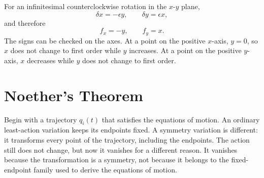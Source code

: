 For an infinitesimal counterclockwise rotation in the \(x\)-\(y\) plane,
\begin{equation}
 \delta x=-\epsilon y,
 \qquad
 \delta y=\epsilon x,
 \label{eq:l04-infinitesimal-rotation}
\end{equation}
and therefore
\begin{equation}
 f_x=-y,
 \qquad f_y=x.
\end{equation}
The signs can be checked on the axes. At a point on the positive \(x\)-axis,
\(y=0\), so \(x\) does not change to first order while \(y\) increases. At a
point on the positive \(y\)-axis, \(x\) decreases while \(y\) does not change
to first order.

\begin{classroomqa}
\end{classroomqa}

\begin{classroomqa}
\end{classroomqa}

\section{Noether's Theorem}

Begin with a trajectory \(q_i(t)\) that satisfies the equations of motion.
An ordinary least-action variation keeps its endpoints fixed. A symmetry
variation is different: it transforms every point of the trajectory, including
the endpoints. The action still does not change, but now it vanishes for a
different reason. It vanishes because the transformation is a symmetry, not
because it belongs to the fixed-endpoint family used to derive the equations
of motion.

